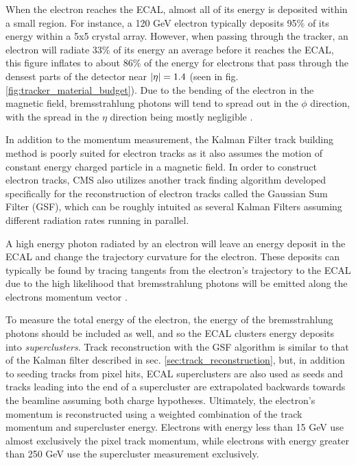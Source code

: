     When the electron reaches the ECAL, almost all of its energy is deposited within a small region. For instance, a 120 GeV electron typically deposits 95\% of its energy within a 5x5 crystal array. However, when passing through the tracker, an electron will radiate 33\% of its energy an average before it reaches the ECAL, this figure inflates to about 86\% of the energy for electrons that pass through the densest parts of the detector near $\lvert \eta \rvert = 1.4$ (seen in fig. \ref{fig:tracker_material_budget}). Due to the bending of the electron in the magnetic field, bremsstrahlung photons will tend to spread out in the $\phi$ direction, with the spread in the $\eta$ direction being mostly negligible \cite[sec. 4.1]{Electron_reco}.

    In addition to the momentum measurement, the Kalman Filter track building method is poorly suited for electron tracks as it also assumes the motion of constant energy charged particle in a magnetic field. In order to construct electron tracks, CMS also utilizes another track finding algorithm developed specifically for the reconstruction of electron tracks called the Gaussian Sum Filter (GSF)\cite{cms_gsf}, which can be roughly intuited as several Kalman Filters assuming different radiation rates running in parallel. 

    A high energy photon radiated by an electron will leave an energy deposit in the ECAL and change the trajectory curvature for the electron. These deposits can typically be found by tracing tangents from the electron's trajectory to the ECAL due to the high likelihood that bremsstrahlung photons will be emitted along the electrons momentum vector . 

    To measure the total energy of the electron, the energy of the bremsstrahlung photons should be included as well, and so the ECAL clusters energy deposits into \emph{superclusters}. Track reconstruction with the GSF algorithm is similar to that of the Kalman filter described in sec. \ref{sec:track_reconstruction}, but, in addition to seeding tracks from pixel hits, ECAL superclusters are also used as seeds and tracks leading into the end of a supercluster are extrapolated backwards towards the beamline assuming both charge hypotheses.  Ultimately, the electron's momentum is reconstructed using a weighted combination of the track momentum and supercluster energy. Electrons with energy less than 15 GeV use almost exclusively the pixel track momentum, while electrons with energy greater than 250 GeV use the supercluster measurement exclusively. 

